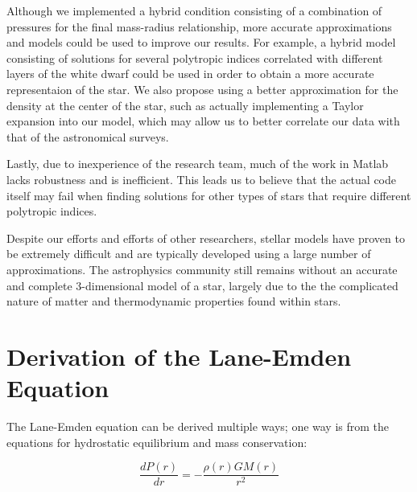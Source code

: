 \documentclass[twoside]{article}
\begin{document}
\begin{multicols}{2}
    Although we implemented a hybrid condition consisting of a combination of
    pressures for the final mass-radius relationship, more accurate
    approximations and models could be used to improve our results. For example,
    a hybrid model consisting of solutions for several polytropic indices
    correlated with different layers of the white dwarf could be used in order
    to obtain a more accurate representaion of the star. We also propose using a
    better approximation for the density at the center of the star, such as
    actually implementing a Taylor expansion into our model, which may allow us
    to better correlate our data with that of the astronomical surveys.

    Lastly, due to inexperience of the research team, much of the work in Matlab
    lacks robustness and is inefficient. This leads us to believe that the
    actual code itself may fail when finding solutions for other types of stars
    that require different polytropic indices.

    Despite our efforts and efforts of other researchers, stellar models have
    proven to be extremely difficult and are typically developed using a large
    number of approximations. The astrophysics community still remains without
    an accurate and complete  3-dimensional model of a star, largely due to the
    the complicated nature of matter and thermodynamic properties found within
    stars.

\end{multicols}



\appendix
\appendixpage
\section{Derivation of the Lane-Emden Equation\cite[pp.176--179]{leblanc2010}} 

The Lane-Emden equation can be derived multiple ways; one way is from the
equations for hydrostatic equilibrium and mass conservation:

\begin{equation}
    \label{eq:hydroeq}
    \frac{dP(r)}{dr} = -\frac{\rho(r)GM(r)}{r^2}
    \end{equation}
\end{document}
